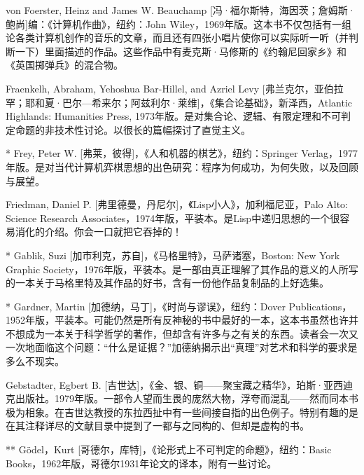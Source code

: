 \begin{thebib}
\begin{biblist}
\item von Foerster, Heinz and James W. Beauchamp [冯·福尔斯特，海因茨；詹姆斯·鲍尚]编：《计算机作曲》，纽约：John Wiley，1969年版。这本书不仅包括有一组论各类计算机创作的音乐的文章，而且还有四张小唱片使你可以实际听一听（并判断一下）里面描述的作品。这些作品中有麦克斯·马修斯的《约翰尼回家乡》和《英国掷弹兵》的混合物。

\item Fraenkelh, Abraham, Yehoshua Bar-Hillel, and Azriel Levy [弗兰克尔，亚伯拉罕；耶和夏·巴尔—希来尔；阿兹利尔·莱维]，《集合论基础》，新泽西，Atlantic Highlands: Humanities Press, 1973年版。是对集合论、逻辑、有限定理和不可判定命题的非技术性讨论。以很长的篇幅探讨了直觉主义。

\item[*] Frey, Peter W. [弗莱，彼得]，《人和机器的棋艺》，纽约：Springer Verlag，1977年版。是对当代计算机弈棋思想的出色研究：程序为何成功，为何失败，以及回顾与展望。

\item Friedman, Daniel P. [弗里德曼，丹尼尔]，《Lisp小人》，加利福尼亚，Palo Alto: Science Research Associates，1974年版，平装本。是Lisp中递归思想的一个很容易消化的介绍。你会一口就把它吞掉的！

\item[*] Gablik, Suzi [加市利克，苏自]，《马格里特》，马萨诸塞，Boston: New York Graphic Society，1976年版，平装本。是一部由真正理解了其作品的意义的人所写的一本关于马格里特及其作品的好书，含有一份他作品复制品的上好选集。

\item[*] Gardner, Martin [加德纳，马丁]，《时尚与谬误》，纽约：Dover Publications，1952年版，平装本。可能仍然是所有反神秘的书中最好的一本，这本书虽然也许并不想成为一本关于科学哲学的著作，但却含有许多与之有关的东西。读者会一次又一次地面临这个问题：“什么是证据？”加德纳揭示出“真理”对艺术和科学的要求是多么不现实。

\item Gebstadter, Egbert B. [吉世达]，《金、银、铜——聚宝藏之精华》，珀斯·亚西迪克出版社。1979年版。一部令人望而生畏的庞然大物，浮夸而混乱——然而同本书极为相象。在吉世达教授的东拉西扯中有一些间接自指的出色例子。特别有趣的是在其注释详尽的文献目录中提到了一都与之同构的、但却是虚构的书。

\item[**] Gödel，Kurt [哥德尔，库特]，《论形式上不可判定的命题》，纽约：Basic Books，1962年版，哥德尔1931年论文的译本，附有一些讨论。


\end{biblist}
\end{thebib}
